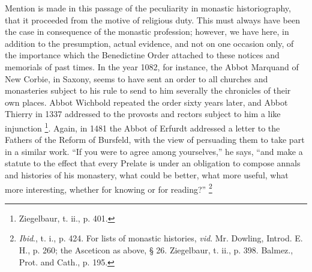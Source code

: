 Mention is made in this passage of the peculiarity in monastic
historiography, that it proceeded from the motive of religious duty.
This must always have been the case in consequence of the
monastic profession; however, we have here, in addition to the
presumption, actual evidence, and not on one occasion only, of the
importance which the Benedictine Order attached to these notices and
memorials of past times. In the year 1082, for instance, the Abbot
Marquand of New Corbie, in Saxony, seems to have sent an order to all
churches and monasteries subject to his rule to send to him severally
the chronicles of their own places. Abbot Wichbold repeated the order
sixty years later, and Abbot Thierry in 1337 addressed to the provosts
and rectors subject to him a like injunction \footnote{Ziegelbaur,
t. ii., p. 401.}. Again, in 1481 the Abbot of Erfurdt addressed a letter to the
Fathers of the Reform of Bursfeld, with the view of persuading them to
take part in a similar work. ``If you were to agree among
yourselves,'' he says, ``and make a statute to the effect that
every Prelate is under an obligation to compose annals and histories
of his monastery, what could be better, what more useful, what more
interesting, whether for knowing or for reading?'' \footnote{\emph{Ibid}.,
t. i., p. 424. For lists of monastic histories, \emph{vid}. Mr.
Dowling, Introd. E. H., p. 260; the Asceticon as above, § 26.
Ziegelbaur, t. ii., p. 398. Balmez., Prot. and Cath., p. 195.}


